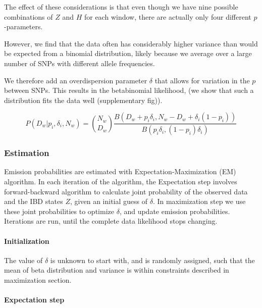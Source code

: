 \documentclass[12pt, letterpaper]{article}
\begin{document}
The effect of these considerations is that even though we have nine possible combinations of $Z$ and $H$ for each window, there are actually only four different $p$-parameters.



However, we find that the data often has considerably higher variance than would be expected from a binomial distribution, likely because we average over a large number of SNPs with different allele frequencies. 

We therefore add an overdispersion parameter $\delta$ that allows for variation in the $p$ between SNPs. This results in the betabinomial likelihood, (we show that such a distribution fits the data well (supplementary fig)).  

\begin{equation}\label{eq:bbsimple}
P(D_{w}|p_i,\delta_i,N_w) = \binom{N_w}{D_w}\frac{B(D_w+p_i \delta_{i}, N_w-D_w+ \delta_{i}(1-p_{i}))}{ B(p_{i}\delta_{i}, (1-p_{i})\delta_{i})}
\end{equation}








\subsubsection{Estimation}

Emission probabilities are estimated with Expectation-Maximization (EM) algorithm. In each iteration of the algorithm, the Expectation step involves forward-backward algorithm to calculate joint probability of the observed data and the IBD states $Z$, given an initial guess of $\delta$. In maximization step we use these joint probabilities to optimize $\delta$, and update emission probabilities. Iterations are run, until the complete data likelihood stops changing. 

\paragraph{Initialization}
The value of $\delta$ is unknown to start with, and is randomly assigned, such that the mean of beta distribution and variance is within constraints described in maximization section.

\paragraph{Expectation step}
\end{document}
